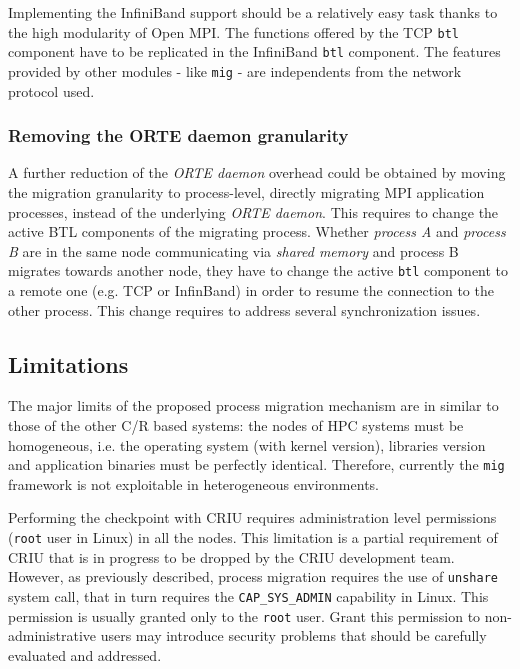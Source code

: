 Implementing the InfiniBand support should be a relatively easy task thanks 
to the high modularity of Open MPI. The
functions offered by the TCP \texttt{btl} component have to be replicated in
the InfiniBand \texttt{btl} component. The features provided by other modules -
like \texttt{mig} - are independents from the network protocol used.

\subsubsection{Removing the ORTE daemon granularity}
A further reduction of the \emph{ORTE daemon} overhead could be obtained by moving the
migration granularity to process-level, directly migrating MPI application
processes, instead of the underlying \emph{ORTE daemon}. This requires to change the
active BTL components of the migrating process. Whether \emph{process A} and
\emph{process B} are in the same node communicating via \emph{shared memory}
and
process B migrates towards another node, they have to change the active
\texttt{btl} component to a remote one (e.g. TCP or InfinBand) in order to
resume the connection to the other process. This change requires to address several
synchronization issues.

\subsection{Limitations}

The major limits of the proposed process migration mechanism are in similar
to those of the other C/R based systems: the nodes of HPC systems must be
homogeneous, i.e. the operating system (with kernel version), libraries version
and application binaries must be perfectly identical. Therefore, currently the
\texttt{mig} framework is not exploitable in heterogeneous environments.

Performing the checkpoint with CRIU requires administration
level permissions (\texttt{root} user in Linux) in all the nodes. This
limitation is a partial requirement of CRIU that is in progress to
be dropped by the CRIU development team. However, as previously
described, process migration requires the use of \texttt{unshare} system call,
that in turn requires the \texttt{CAP\_SYS\_ADMIN} capability in Linux. This
permission is usually granted only to the \texttt{root} user. Grant this
permission to non-administrative users may introduce security problems that
should be carefully evaluated and addressed.

